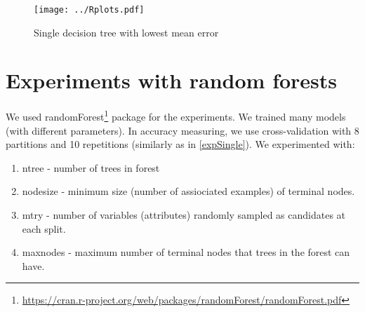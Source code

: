 \documentclass[a4paper]{article}
\begin{document}
\begin{multicols}{2}
\begin{figure}[H]
    \centering
    \texttt{[image: ../Rplots.pdf]}
    \label{fig:single}
    \caption[]{Single decision tree with lowest mean error}
\end{figure}

% 
% 
% 
\section{Experiments with random forests}
\label{forest}
We used randomForest\footnote{\url{https://cran.r-project.org/web/packages/randomForest/randomForest.pdf}} package for the experiments.
We trained many models (with different parameters).
In accuracy measuring, we use cross-validation with 8 partitions
and 10 repetitions (similarly as in \ref{expSingle}).
We experimented with:
\begin{enumerate}
    \item ntree - number of trees in forest
    \item nodesize - minimum size (number of assiociated examples) of terminal nodes.
    \item mtry - number of variables (attributes) randomly sampled as candidates at each split.
    \item maxnodes - maximum number of terminal nodes that trees in the forest can have.
\end{enumerate}


\end{multicols}
\end{document}
